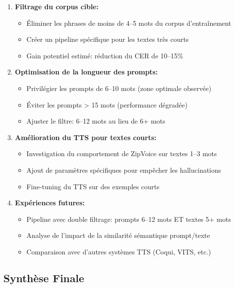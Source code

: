 \documentclass[12pt,a4paper]{article}
\begin{document}
\begin{enumerate}
    \item \textbf{Filtrage du corpus cible:}
    \begin{itemize}
        \item Éliminer les phrases de moins de 4--5 mots du corpus d'entraînement
        \item Créer un pipeline spécifique pour les textes très courts
        \item Gain potentiel estimé: réduction du CER de 10--15\%
    \end{itemize}
    
    \item \textbf{Optimisation de la longueur des prompts:}
    \begin{itemize}
        \item Privilégier les prompts de 6--10 mots (zone optimale observée)
        \item Éviter les prompts > 15 mots (performance dégradée)
        \item Ajuster le filtre: 6--12 mots au lieu de 6+ mots
    \end{itemize}
    
    \item \textbf{Amélioration du TTS pour textes courts:}
    \begin{itemize}
        \item Investigation du comportement de ZipVoice sur textes 1--3 mots
        \item Ajout de paramètres spécifiques pour empêcher les hallucinations
        \item Fine-tuning du TTS sur des exemples courts
    \end{itemize}
    
    \item \textbf{Expériences futures:}
    \begin{itemize}
        \item Pipeline avec double filtrage: prompts 6--12 mots ET textes 5+ mots
        \item Analyse de l'impact de la similarité sémantique prompt/texte
        \item Comparaison avec d'autres systèmes TTS (Coqui, VITS, etc.)
    \end{itemize}
\end{enumerate}

\subsection{Synthèse Finale}
\end{document}
